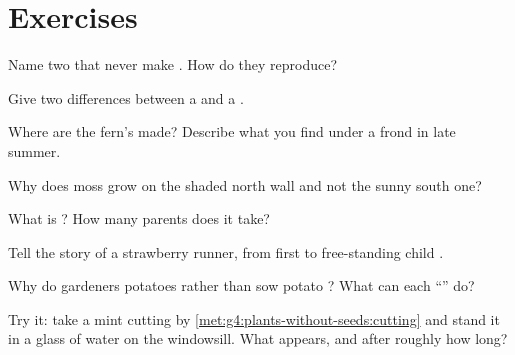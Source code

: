 \section{Exercises}

\begin{exercise}[$\star$]\label{exo:g4:plants-without-seeds:1}
Name two  that never make . How do they reproduce?
\end{exercise}

\begin{exercise}[$\star$]\label{exo:g4:plants-without-seeds:2}
Give two differences between a  and a .
\end{exercise}

\begin{exercise}[$\star$]\label{exo:g4:plants-without-seeds:3}
Where are the fern's  made? Describe what you find
under a frond in late summer.
\end{exercise}

\begin{exercise}[$\star$]\label{exo:g4:plants-without-seeds:4}
Why does moss grow on the shaded north wall and not the sunny
south one?
\end{exercise}

\begin{exercise}[$\star$]\label{exo:g4:plants-without-seeds:5}
What is ? How many parents does it
take?
\end{exercise}

\begin{exercise}[$\star$]\label{exo:g4:plants-without-seeds:6}
Tell the story of a strawberry runner, from first  to
free-standing child .
\end{exercise}

\begin{exercise}[$\star$]\label{exo:g4:plants-without-seeds:7}
Why do gardeners  potatoes rather than sow potato ?
What can each ``'' do?
\end{exercise}

\begin{exercise}[$\star$]\label{exo:g4:plants-without-seeds:8}
Try it: take a mint cutting by
\cref{met:g4:plants-without-seeds:cutting} and stand it in a
glass of water on the windowsill. What appears, and after
roughly how long?
\end{exercise}

